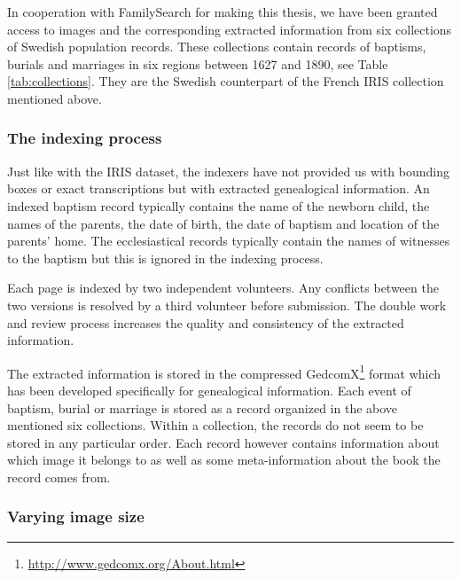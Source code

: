 

In cooperation with FamilySearch for making this thesis, we have been granted access to images and the corresponding extracted information from six collections of Swedish population records.
These collections contain records of baptisms, burials and marriages in six regions between 1627 and 1890, see Table \ref{tab:collections}. They are the Swedish counterpart of the French IRIS collection mentioned above.



\subsubsection{The indexing process}

Just like with the IRIS dataset, the indexers have not provided us with bounding boxes or exact transcriptions but with extracted genealogical information. An indexed baptism record typically contains the name of the newborn child, the names of the parents, the date of birth, the date of baptism and location of the parents' home. The ecclesiastical records typically contain the names of witnesses to the baptism but this is ignored in the indexing process.

Each page is indexed by two independent volunteers. Any conflicts between the two versions is resolved by a third volunteer before submission.
The double work and review process increases the quality and consistency of the extracted information.

The extracted information is stored in the compressed GedcomX\footnote{\url{http://www.gedcomx.org/About.html}} format which has been developed specifically for genealogical information.
Each event of baptism, burial or marriage is stored as a record organized in the above mentioned six collections. Within a collection, the records do not seem to be stored in any particular order. Each record however contains information about which image it belongs to as well as some meta-information about the book the record comes from.

\subsubsection{Varying image size}

